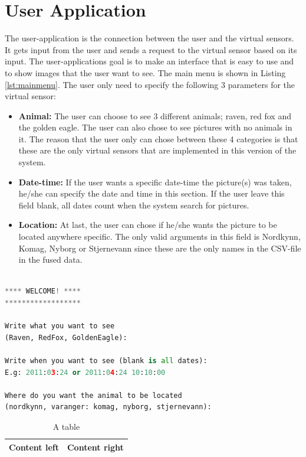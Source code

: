 \documentclass[USenglish]{uit-thesis}
\begin{document}
\section{User Application}
The user-application is the connection between  the user and the virtual sensors. It gets input from the user and sends a request to the virtual sensor based on its input. The user-applications goal is to make an interface that is easy to use and to show images that the user want to see. The main menu is shown in Listing \ref{lst:mainmenu}.
The user only need to specify the following 3 parameters for the virtual sensor:

\begin{itemize}
\item \textbf{Animal:} The user can choose to see 3 different animals; raven, red fox and the golden eagle. The user can also chose to see pictures with no animals in it. The reason that the user only can chose between these 4 categories is that these are the only virtual sensors that are implemented in this version of the system.
\item \textbf{Date-time:} If the user wants a specific date-time the picture(s) was taken, he/she can specify the date and time in this section. If the user leave this field blank, all dates count when the system search for pictures.
\item \textbf{Location:} At last, the user can chose if he/she wants the picture to be located anywhere specific. The only valid arguments in this field is Nordkynn, Komag, Nyborg or Stjernevann since these are the only names in the CSV-file in the fused data.
\end{itemize}

\begin{lstlisting}[frame=single,caption={Main menu },label={lst:mainmenu}, language=Python]

**** WELCOME! ****
******************

Write what you want to see
(Raven, RedFox, GoldenEagle): 

Write when you want to see (blank is all dates): 
E.g: 2011:03:24 or 2011:04:24 10:10:00

Where do you want the animal to be located
(nordkynn, varanger: komag, nyborg, stjernevann):
\end{lstlisting}


\iffalse 
\begin{table}
\centering
\begin{tabular}{|l|l|}
\hline
Content left & Content right\\
\hline
\end{tabular}
\caption{A table}
\end{table}
\end{document}
